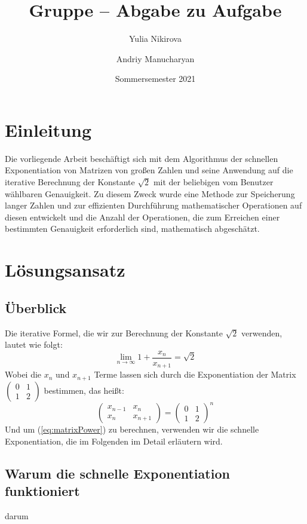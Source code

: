 \documentclass[course=erap]{aspdoc}
\author{Yulia Nikirova \and Andriy Manucharyan}
\date{Sommersemester 2021} %
\title{Gruppe \theGroup{} -- Abgabe zu Aufgabe \theNumber}
\begin{document}
\maketitle

\section{Einleitung}
Die vorliegende Arbeit beschäftigt sich mit dem Algorithmus der schnellen Exponentiation von Matrizen von großen Zahlen und seine Anwendung auf die iterative Berechnung der Konstante  \(\sqrt{2}\) mit der beliebigen vom Benutzer wählbaren Genauigkeit. Zu diesem Zweck wurde eine Methode zur Speicherung langer Zahlen und zur effizienten Durchführung mathematischer Operationen auf diesen entwickelt und die Anzahl der Operationen, die zum Erreichen einer bestimmten Genauigkeit erforderlich sind, mathematisch abgeschätzt.
\section{Lösungsansatz}
\subsection{Überblick}%
Die iterative Formel, die wir zur Berechnung der Konstante \(\sqrt{2}\) verwenden, lautet wie folgt:
\begin{equation}\label{eq:iterativeSqrt2}
\lim_{n \to \infty} {1+\frac{x_n}{x_{n+1}}} = \sqrt{2} 
\end{equation}
Wobei die $x_n$ und $x_{n+1}$ Terme lassen sich durch die Exponentiation der Matrix
$\begin{pmatrix}
  0 & 1\\ 
  1 & 2
\end{pmatrix}$ bestimmen, das heißt:
\begin{equation}\label{eq:matrixPower}
{\begin{pmatrix}
x_{n-1} & x_n \\
x_n & x_{n+1}
\end{pmatrix} } =
{\begin{pmatrix}
0 & 1\\
1 & 2
\end{pmatrix} }^n
\end{equation}
Und um (\ref{eq:matrixPower}) zu berechnen, verwenden wir die schnelle Exponentiation, die im Folgenden im Detail erläutern wird.
\subsection{Warum die schnelle Exponentiation funktioniert}%
darum
\end{document}
